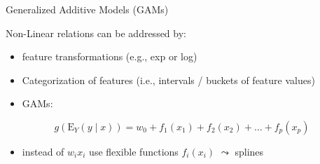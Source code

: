\documentclass[11pt,compress,t,notes=noshow, xcolor=table]{beamer}
\begin{document}

\begin{vbframe}{Generalized Additive Models (GAMs)}

Non-Linear relations can be addressed by:
    \begin{itemize}
        \item feature transformations (e.g., exp or log)
        \item Categorization of features (i.e., intervals / buckets of feature values)
        \item GAMs:
    \end{itemize}
    
    $$g(\mathrm{E}_Y (y\mid x)) = w_0 + f_1(x_1) + f_2(x_2) + \ldots + f_p(x_p)$$
    
    \begin{itemize}
        \item instead of $w_i x_i$ use flexible functions $f_i(x_i)$ $\leadsto$ splines
    \end{itemize}

\end{vbframe}

\end{document}
